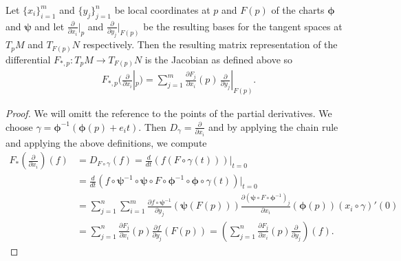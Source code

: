 \documentclass[../master_thesis.tex]{subfiles}
\begin{document}
\begin{proposition}
    Let $\{x_i\}_{i=1}^m$ and $\{y_j\}_{j=1}^n$ be local coordinates at 
    $p$ and $F(p)$ of the charts $\bm{\phi}$ and $\bm{\psi}$ and let $\frac{\partial}{\partial x_i}|_p$ and 
    $\frac{\partial}{\partial y_j}|_{F(p)}$ be the resulting bases for the 
    tangent spaces at $T_p M$ and $T_{F(p)} N$ respectively. Then 
    the resulting matrix representation of the differential 
    $F_{*,p}:T_p M \rightarrow 
    T_{F(p)}N$ is the Jacobian as defined above so
    \begin{align*}
        F_{*,p} \bigg( \frac{\partial}{\partial x_i}|_p \bigg)
        = \sum_{j=1}^m \frac{\partial F_j}{\partial x_i}(p)\,
            \frac{\partial}{\partial y_j}|_{F(p)}. 
    \end{align*}
\end{proposition}
\begin{proof}
    We will omitt the reference to the points of the partial derivatives.
    We choose $\gamma = \boldsymbol{\phi}^{-1}(\boldsymbol{\phi}(p) + e_i t)$. Then 
    $D_\gamma = \frac{\partial}{\partial x_i}$ and by applying the chain 
    rule and applying the above definitions, we compute
    \begin{align*}
        F_{*}(\frac{\partial}{\partial x_i})(f)
        &= D_{F\circ \gamma}(f)
        = \frac{d}{dt} (f(F \circ \gamma(t) ) )|_{t=0} 
        \\ &= \frac{d}{dt} (f \circ \boldsymbol{\psi}^{-1} \circ \boldsymbol{\psi}   
            \circ F \circ \boldsymbol{\phi}^{-1} \circ \boldsymbol{\phi} \circ \gamma(t)  )|_{t=0}
        \\ &= \sum_{j=1}^n \sum_{i=1}^m \frac{\partial f \circ \boldsymbol{\psi}^{-1}}{\partial y_j}
            (\boldsymbol{\psi}(F(p)))  \frac{\partial (\boldsymbol{\psi} \circ F \circ \boldsymbol{\phi}^{-1})_j}{\partial x_i}
            (\boldsymbol{\phi}(p))  (x_i \circ \gamma)'(0)
        \\ &= \sum_{j=1}^n \frac{\partial F_j}{\partial x_i}(p) 
            \frac{\partial f}{\partial y_j}(F(p))
        = \left( \sum_{j=1}^n \frac{\partial F_j}{\partial x_i}(p) 
            \frac{\partial}{\partial y_j} \right) (f).
    \end{align*} 
\end{proof}
\end{document}
